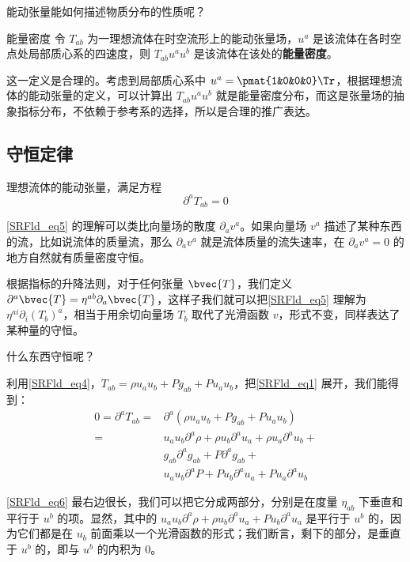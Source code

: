 能动张量能如何描述物质分布的性质呢？

\begin{definition}{能量密度}
令 $T_{ab}$ 为一理想流体在时空流形上的能动张量场，$u^a$ 是该流体在各时空点处局部质心系的四速度，则 $T_{ab}u^au^b$ 是该流体在该处的\textbf{能量密度}。
\end{definition}

这一定义是合理的。考虑到局部质心系中 $u^a=\pmat{1&0&0&0}\Tr$，根据理想流体的能动张量的定义，可以计算出 $T_{ab}u^au^b$ 就是能量密度分布，而这是张量场的抽象指标分布，不依赖于参考系的选择，所以是合理的推广表达。

\subsection{守恒定律}

理想流体的能动张量，满足方程
\begin{equation}\label{SRFld_eq5}
\partial^aT_{ab}=0
\end{equation}

\autoref{SRFld_eq5} 的理解可以类比向量场的散度 $\partial_av^a$。如果向量场 $v^a$ 描述了某种东西的流，比如说流体的质量流，那么 $\partial_av^a$ 就是流体质量的流失速率，在 $\partial_av^a=0$ 的地方自然就有质量密度守恒。

根据指标的升降法则，对于任何张量 $\bvec{T}$，我们定义 $\partial^a\bvec{T}=\eta^{ab}\partial_a\bvec{T}$，这样子我们就可以把\autoref{SRFld_eq5} 理解为 $\eta^{ai}\partial_i(T_b)^a$，相当于用余切向量场 $T_b$ 取代了光滑函数 $v$，形式不变，同样表达了某种量的守恒。

什么东西守恒呢？

利用\autoref{SRFld_eq4}，$T_{ab}=\rho u_au_b+P g_{ab}+P u_au_b$，把\autoref{SRFld_eq1} 展开，我们能得到：
\begin{equation}\label{SRFld_eq6}
\begin{aligned}
0=\partial^aT_{ab}=&\partial^a(\rho u_au_b+P g_{ab}+P u_au_b)\\
=&u_au_b\partial^a\rho+\rho u_b\partial^au_a+\rho u_a\partial^au_b+\\
&g_{ab}\partial^ag_{ab}+P\partial^ag_{ab}+\\
&u_au_b\partial^aP+P u_b\partial^au_a+P u_a\partial^au_b
\end{aligned}
\end{equation}

\autoref{SRFld_eq6} 最右边很长，我们可以把它分成两部分，分别是在度量 $\eta_{ab}$ 下垂直和平行于 $u^b$ 的项。显然，其中的 $u_au_b\partial^a\rho+\rho u_b\partial^au_a+P u_b\partial^au_a$ 是平行于 $u^b$ 的，因为它们都是在 $u_b$ 前面乘以一个光滑函数的形式；我们断言，剩下的部分，是垂直于 $u^b$ 的，即与 $u^b$ 的内积为 $0$。

